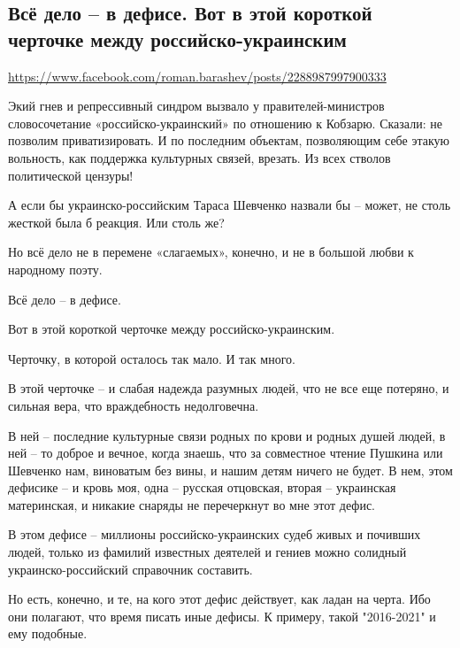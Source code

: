  
 
 
 
 

\subsection{Всё дело – в дефисе. Вот в этой короткой черточке между российско-украинским}
\label{sec:04_04_2021.fb.barashev_roman.1.shevchenko}
\url{https://www.facebook.com/roman.barashev/posts/2288987997900333}

Экий гнев и репрессивный синдром вызвало у правителей-министров словосочетание
«российско-украинский» по отношению к Кобзарю. Сказали: не позволим
приватизировать. И по последним объектам, позволяющим себе этакую вольность,
как поддержка культурных связей, врезать. Из всех стволов политической цензуры! 

А если бы украинско-российским Тараса Шевченко назвали бы – может, не столь
жесткой была б реакция. Или столь же?

Но всё дело не в перемене «слагаемых», конечно, и не в большой любви к
народному поэту.

Всё дело – в дефисе.

Вот в этой короткой черточке между российско-украинским.

Черточку, в которой осталось так мало. И так много.

В этой черточке – и слабая надежда разумных людей, что не все еще потеряно, и
сильная вера, что враждебность недолговечна.

В ней – последние культурные связи родных по крови и родных душей людей, в ней
– то доброе и вечное, когда знаешь, что за совместное чтение Пушкина или
Шевченко нам, виноватым без вины, и нашим детям ничего не будет. В нем, этом
дефисике – и кровь моя, одна – русская отцовская, вторая – украинская
материнская, и никакие снаряды не перечеркнут во мне этот дефис.

В этом дефисе – миллионы российско-украинских судеб живых и почивших людей,
только из фамилий известных деятелей и гениев можно солидный
украинско-российский справочник составить.

Но есть, конечно, и те, на кого этот дефис действует, как ладан на черта. Ибо
они полагают, что время писать иные дефисы. К примеру, такой "2016-2021" и ему
подобные.

